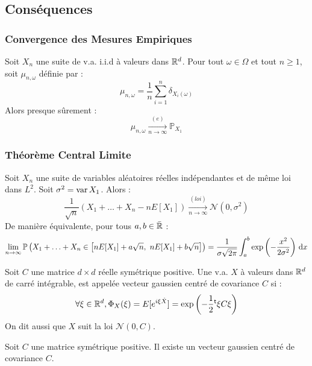 \documentclass{cours}
\begin{document}
\subsection{Conséquences}
\subsubsection{Convergence des Mesures Empiriques}
\begin{theorem}
    Soit $X_{n}$ une suite de v.a. i.i.d à valeurs dans $\mathbb{R}^{d}$. Pour tout $\omega \in \Omega$ et tout $n \geq 1$, soit $\mu_{n, \omega}$ définie par :
    \[
        \mu_{n, \omega} = \frac{1}{n}\sum_{i = 1}^{n}\delta_{X_{i}(\omega)}
    \]
    Alors presque sûrement :
    \[
        \mu_{n, \omega} \xrightarrow[n \to \infty]{(e)} \mathbb{P}_{X_{1}}
    \]
\end{theorem}

\subsubsection{Théorème Central Limite}
\begin{theorem}
    Soit $X_{n}$ une suite de variables aléatoires réelles indépendantes et de même loi dans $L^{2}$. Soit $\sigma^{2} =\operatorname{var} X_{1}$. Alors :
    \[
        \frac{1}{\sqrt{n}}\left(X_{1} + \ldots + X_{n} - n E[X_{1}]\right) \xrightarrow[n \to \infty]{(loi)} \mathcal{N}(0, \sigma^{2})
    \]
    De manière équivalente, pour tous $a, b \in \bar{\mathbb{R}}$ :
    \[
        \lim_{n \to \infty} \mathbb{P}\left(X_{1} + \ldots + X_{n} \in \left[n E[X_{1}] + a\sqrt{n}, \ nE[X_{1}] + b\sqrt{n}\right]\right) = \frac{1}{\sigma\sqrt{2\pi}}\int_{a}^{b}\exp\left(-\frac{x^{2}}{2\sigma^{2}}\right){\rm \, d} x
    \]
\end{theorem}

\begin{definition}
    Soit $C$ une matrice $d \times d$ réelle symétrique positive. Une v.a. $X$ à valeurs dans $\mathbb{R}^{d}$ de carré intégrable, est appelée vecteur gaussien centré de covariance $C$ si :
    \[
        \forall \xi \in \mathbb{R}^{d}, \Phi_{X}(\xi) = E[e^{i\xi\dot X}] = \exp\left(-\frac{1}{2}{^{\mathsf{t}}}\xi C\xi\right)
    \]
    On dit aussi que $X$ suit la loi $\mathcal{N}(0, C)$.
\end{definition}

\begin{proposition}
    Soit $C$ une matrice symétrique positive. Il existe un vecteur gaussien centré de covariance $C$.
\end{proposition}
\end{document}
